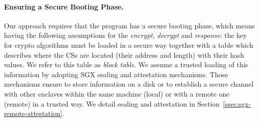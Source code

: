 \paragraph{Ensuring a Secure Booting Phase.}
Our approach requires that the program has a secure booting phase, which means 
having the following assumptions for the
\emph{encrypt}, \emph{decrypt} and \emph{response}: the key for crypto 
algorithms must be loaded in a secure way together with a table which describes 
where the CSs are located (\ie their address and length) with their hash values.
We refer to this table as \emph{block table}.
We assume a trusted loading of this information by adopting SGX sealing and 
attestation mechanisms.
Those mechanisms ensure to store information on a disk or to establish a secure 
channel with other enclaves within the same machine (\ie local) or with a 
remote one (\ie remote) in a trusted way.
We detail sealing and attestation in Section~\ref{ssec:sgx-remote-attestation}.

